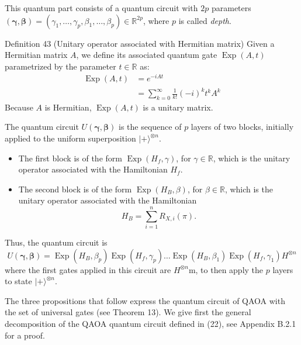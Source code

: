 This quantum part consists of a quantum circuit with $2 p$ parameters $(\boldsymbol{\gamma}, \boldsymbol{\beta})=\left(\gamma_{1}, \ldots, \gamma_{p}, \beta_{1}, \ldots, \beta_{p}\right) \in \mathbb{R}^{2 p}$, where $p$ is called \textit{depth}. 

\begin{definition}
    Definition 43 (Unitary operator associated with Hermitian matrix) Given a Hermitian matrix $A$, we define its associated quantum gate $\operatorname{Exp}(A, t)$ parametrized by the parameter $t \in \mathbb{R}$ as:
$$
\begin{aligned}
\operatorname{Exp}(A, t) & =e^{-i A t} \\
& =\sum_{k=0}^{\infty} \frac{1}{k!}(-i)^{k} t^{k} A^{k}
\end{aligned}
$$
Because $A$ is Hermitian, $\operatorname{Exp}(A, t)$ is a unitary matrix.
\end{definition}

The quantum circuit $U(\boldsymbol{\gamma}, \boldsymbol{\beta})$ is the sequence of $p$ layers of two blocks, initially applied to the uniform superposition $|+\rangle^{\otimes n}$. %
\begin{itemize}
    \item The first block is of the form $\operatorname{Exp}\left(H_{f}, \gamma\right)$, for $\gamma \in \mathbb{R}$, which is the unitary operator associated with the Hamiltonian $H_{f}$.
    \item The second block is of the form $\operatorname{Exp}\left(H_{B}, \beta\right)$, for $\beta \in \mathbb{R}$, which is the unitary operator associated with the Hamiltonian
    $$
  H_{B}=\sum_{i=1}^{n} R_{X, i}(\pi).
  $$
\end{itemize}
Thus, the quantum circuit is
\begin{equation*}
U(\boldsymbol{\gamma}, \boldsymbol{\beta})=\operatorname{Exp}\left(H_{B}, \beta_{p}\right) \operatorname{Exp}\left(H_{f}, \gamma_{p}\right) \ldots \operatorname{Exp}\left(H_{B}, \beta_{1}\right) \operatorname{Exp}\left(H_{f}, \gamma_{1}\right) H^{\otimes n} \tag{22}
\end{equation*}
where the first gates applied in this circuit are $H^{\otimes n}$m, to then apply the $p$ layers to state $|+\rangle^{\otimes n}$. 

The three propositions that follow express the quantum circuit of QAOA with the set of universal gates (see Theorem 13). We give first the general decomposition of the QAOA quantum circuit defined in (22), see Appendix B.2.1 for a proof.

